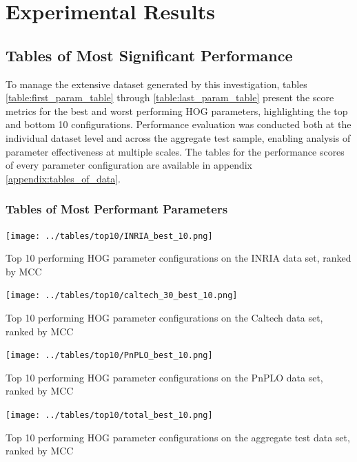 \section{Experimental Results}

\subsection{Tables of Most Significant Performance}
To manage the extensive dataset generated by this investigation, tables \ref{table:first_param_table} through \ref{table:last_param_table} present the score metrics for the best and worst performing HOG parameters, highlighting the top and bottom 10 configurations. Performance evaluation was conducted both at the individual dataset level and across the aggregate test sample, enabling analysis of parameter effectiveness at multiple scales. The tables for the performance scores of every parameter configuration are available in appendix \ref{appendix:tables_of_data}.

\subsubsection{Tables of Most Performant Parameters}\label{section:best_tables}

\begin{table}
    \centering
    \texttt{[image: ../tables/top10/INRIA\_best\_10.png]}
    \caption{Top 10 performing HOG parameter configurations on the INRIA data set, ranked by MCC}
    \label{table:first_param_table}
\end{table}

\begin{table}
    \centering
    \texttt{[image: ../tables/top10/caltech\_30\_best\_10.png]}
    \caption{Top 10 performing HOG parameter configurations on the Caltech data set, ranked by MCC}
\end{table}

\begin{table}
    \centering
    \texttt{[image: ../tables/top10/PnPLO\_best\_10.png]}
    \caption{Top 10 performing HOG parameter configurations on the PnPLO data set, ranked by MCC}
\end{table}

\begin{table}
    \centering
    \texttt{[image: ../tables/top10/total\_best\_10.png]}
    \caption{Top 10 performing HOG parameter configurations on the aggregate test data set, ranked by MCC}
\end{table}

